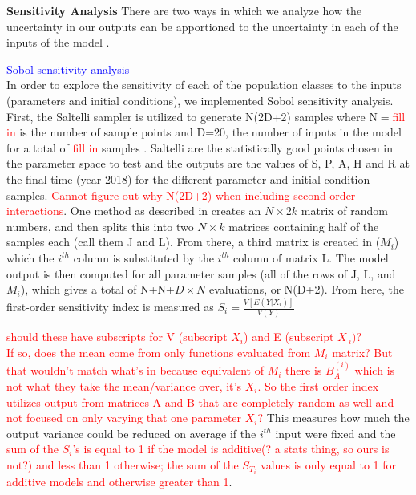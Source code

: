 \documentclass[12pt]{article}
\begin{document}
\textbf{Sensitivity Analysis} 
There are two ways in which we analyze how the uncertainty in our outputs can be apportioned to the uncertainty in each of the inputs of the model \cite{Herman, Marino}. 



\textcolor{blue}{Sobol sensitivity analysis} \\
In order to explore the sensitivity of each of the population classes to the inputs (parameters and initial conditions), we implemented Sobol sensitivity analysis. First, the Saltelli sampler is utilized to generate N(2D+2) samples where N$=$\textcolor{red}{fill in} is the number of sample points and D=20, the number of inputs in the model for a total of \textcolor{red}{fill in} samples \cite{Herman}. 
Saltelli are the statistically good points chosen in the parameter space to test and the outputs are the values of S, P, A, H and R at the final time (year 2018) for the different parameter and initial condition samples. 
\textcolor{red}{Cannot figure out why N(2D+2) when including second order interactions}. 
One method as described in \cite{Saltelli1} creates an $N \times 2k$ matrix of random numbers, and then splits this into two $N \times k$ matrices containing half of the samples each (call them J and L). From there, a third matrix is created in ($M_i$) which the $i^{th}$ column is substituted by the $i^{th}$ column of matrix L. The model output is then computed for all parameter samples (all of the rows of J, L, and $M_i$), which gives a total of N+N+$D\times N$ evaluations, or N(D+2). 
From here, the first-order sensitivity index is measured as $S_i=\frac{V[E(Y|X_i)]}{V(Y)}$ 

\textcolor{red}{should these have subscripts for V (subscript $X_i$) and E (subscript $X_{~i})$?  \\
If so, does the mean come from only functions evaluated from $M_i$ matrix? But that wouldn't match what's in} \cite{Saltelli2} \textcolor{red}{because equivalent of $M_i$ there is $B_A^{(i)}$ which is not what they take the mean/variance over, it's $X_i$.} \textcolor{red}{So the first order index utilizes output from matrices A and B that are completely random as well and not focused on only varying that one parameter $X_i$?} This measures how much the output variance could be reduced on average if the $i^{th}$ input were fixed and the \textcolor{red}{sum of the $S_i$'s is equal to 1 if the model is additive(? a stats thing, so ours is not?) and less than 1 otherwise; the sum of the $S_{T_i}$ values is only equal to 1 for additive models and otherwise greater than 1}. 
\end{document}
